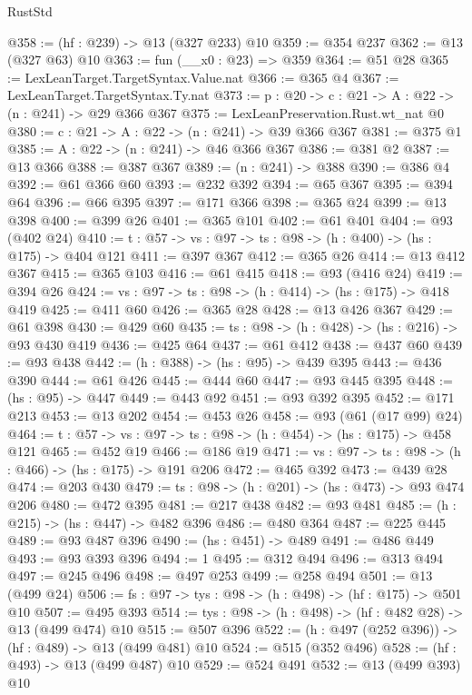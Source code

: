 \begin{lexlean}{RustStd}
\begin{coremodule}
@358 := (hf : @239) -> @13 (@327 @233) @10
@359 := @354 @237
@362 := @13 (@327 @63) @10
@363 := fun (__x0 : @23) => @359
@364 := @51 @28
@365 := LexLeanTarget.TargetSyntax.Value.nat
@366 := @365 @4
@367 := LexLeanTarget.TargetSyntax.Ty.nat
@373 := {p : @20} -> {c : @21} -> {A : @22} -> (n : @241) -> @29 @366 @367
@375 := LexLeanPreservation.Rust.wt_nat @0
@380 := {c : @21} -> {A : @22} -> (n : @241) -> @39 @366 @367
@381 := @375 @1
@385 := {A : @22} -> (n : @241) -> @46 @366 @367
@386 := @381 @2
@387 := @13 @366
@388 := @387 @367
@389 := (n : @241) -> @388
@390 := @386 @4
@392 := @61 @366 @60
@393 := @232 @392
@394 := @65 @367
@395 := @394 @64
@396 := @66 @395
@397 := @171 @366
@398 := @365 @24
@399 := @13 @398
@400 := @399 @26
@401 := @365 @101
@402 := @61 @401
@404 := @93 (@402 @24)
@410 := {t : @57} -> {vs : @97} -> {ts : @98} -> (h : @400) -> (hs : @175) -> @404 @121
@411 := @397 @367
@412 := @365 @26
@414 := @13 @412 @367
@415 := @365 @103
@416 := @61 @415
@418 := @93 (@416 @24)
@419 := @394 @26
@424 := {vs : @97} -> {ts : @98} -> (h : @414) -> (hs : @175) -> @418 @419
@425 := @411 @60
@426 := @365 @28
@428 := @13 @426 @367
@429 := @61 @398
@430 := @429 @60
@435 := {ts : @98} -> (h : @428) -> (hs : @216) -> @93 @430 @419
@436 := @425 @64
@437 := @61 @412
@438 := @437 @60
@439 := @93 @438
@442 := (h : @388) -> (hs : @95) -> @439 @395
@443 := @436 @390
@444 := @61 @426
@445 := @444 @60
@447 := @93 @445 @395
@448 := (hs : @95) -> @447
@449 := @443 @92
@451 := @93 @392 @395
@452 := @171 @213
@453 := @13 @202
@454 := @453 @26
@458 := @93 (@61 (@17 @99) @24)
@464 := {t : @57} -> {vs : @97} -> {ts : @98} -> (h : @454) -> (hs : @175) -> @458 @121
@465 := @452 @19
@466 := @186 @19
@471 := {vs : @97} -> {ts : @98} -> (h : @466) -> (hs : @175) -> @191 @206
@472 := @465 @392
@473 := @439 @28
@474 := @203 @430
@479 := {ts : @98} -> (h : @201) -> (hs : @473) -> @93 @474 @206
@480 := @472 @395
@481 := @217 @438
@482 := @93 @481
@485 := (h : @215) -> (hs : @447) -> @482 @396
@486 := @480 @364
@487 := @225 @445
@489 := @93 @487 @396
@490 := (hs : @451) -> @489
@491 := @486 @449
@493 := @93 @393 @396
@494 := 1
@495 := @312 @494
@496 := @313 @494
@497 := @245 @496
@498 := @497 @253
@499 := @258 @494
@501 := @13 (@499 @24)
@506 := {fs : @97} -> {tys : @98} -> (h : @498) -> (hf : @175) -> @501 @10
@507 := @495 @393
@514 := {tys : @98} -> (h : @498) -> (hf : @482 @28) -> @13 (@499 @474) @10
@515 := @507 @396
@522 := (h : @497 (@252 @396)) -> (hf : @489) -> @13 (@499 @481) @10
@524 := @515 (@352 @496)
@528 := (hf : @493) -> @13 (@499 @487) @10
@529 := @524 @491
@532 := @13 (@499 @393) @10

\end{coremodule}
\end{lexlean}

